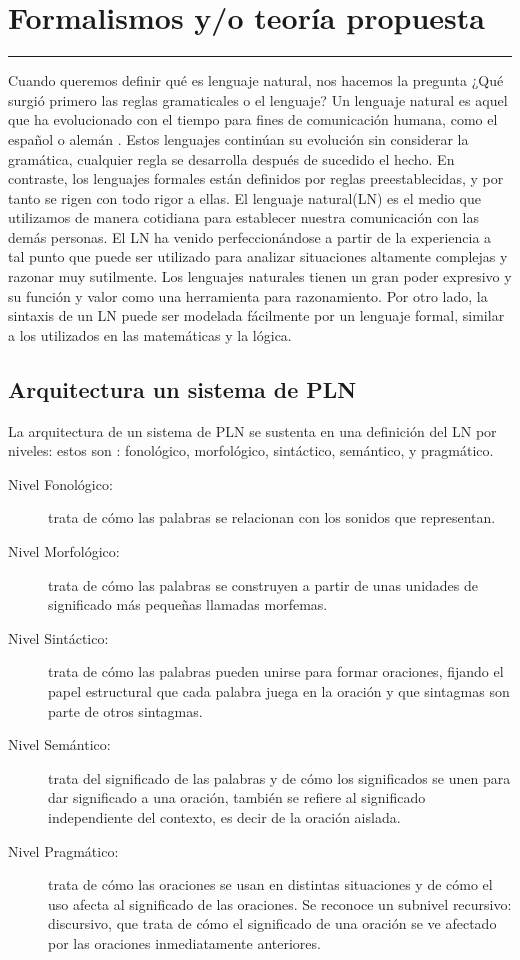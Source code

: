 \chapter{Formalismos y/o teoría propuesta}
\hrule \bigskip \vspace*{1cm}
Cuando queremos definir qué es lenguaje natural, nos hacemos la pregunta ¿Qué surgió primero las reglas gramaticales o el lenguaje? Un lenguaje natural es aquel que ha evolucionado con el tiempo para fines de comunicación humana, como el español o alemán \cite{BROOKSHEAR}. 
Estos lenguajes continúan su evolución sin considerar la gramática, cualquier regla se desarrolla después de sucedido el hecho. En contraste, los lenguajes formales están definidos por reglas preestablecidas, y por tanto se rigen con todo rigor a ellas. El lenguaje natural(LN) es el medio que utilizamos de manera cotidiana para establecer nuestra comunicación con las demás personas. El LN ha venido perfeccionándose a partir de la experiencia a tal punto que  puede ser utilizado para analizar situaciones altamente
complejas y razonar muy sutilmente. Los lenguajes naturales tienen un gran poder expresivo y su función y valor como una herramienta para razonamiento. Por otro lado, la sintaxis de un LN puede ser modelada fácilmente por un lenguaje formal, similar a los utilizados en las matemáticas y la lógica.

\section{Arquitectura un sistema de PLN}

La arquitectura de un sistema de PLN se sustenta en
una definición del LN por niveles: estos son : fonológico, morfológico, sintáctico, semántico, y pragmático.

\begin{description}
\item[Nivel Fonológico:] trata de cómo las palabras se relacionan con los sonidos que representan.
\item[Nivel Morfológico:]  trata de cómo las palabras se construyen a partir de unas unidades de significado más pequeñas llamadas morfemas.
\item[Nivel Sintáctico: ] trata de cómo las palabras pueden unirse para formar  oraciones, fijando el papel estructural que cada palabra juega en la oración y que sintagmas son parte de otros sintagmas.
\item[ Nivel Semántico:] trata del significado de las palabras y de cómo los  significados se unen para dar significado a una oración, también se refiere al  significado independiente del contexto, es decir de la oración aislada. 
\item[Nivel Pragmático:]  trata de cómo las oraciones se usan en distintas situaciones y de cómo el uso afecta al significado de las oraciones. Se reconoce un subnivel recursivo: discursivo, que trata de cómo el significado de una oración se ve afectado por las oraciones inmediatamente anteriores. 
\end{description}

